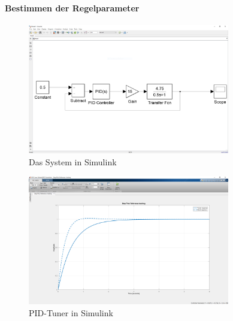 \documentclass[a4paper,12pt]{report}
\begin{document}
	\paragraph{Bestimmen der Regelparameter}
	\begin{figure}[ht]
		\centering
		\includegraphics[width=250pt,keepaspectratio]{assets/Simulink.PNG}
		\caption{Das System in Simulink}
		\label{img-Simulink}
	\end{figure}
	
	\begin{figure}[ht]
		\centering
		\includegraphics[width=250pt,keepaspectratio]{assets/PID-Tuner.PNG}
		\caption{PID-Tuner in Simulink}
		\label{img-PID-Tuner}
	\end{figure}
\end{document}
